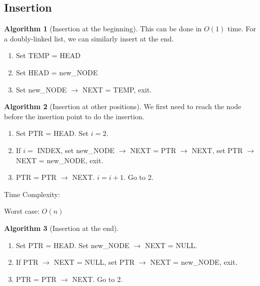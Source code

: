 \documentclass[10pt, a4paper]{extarticle}
\theoremstyle{definition}
\newtheorem{alg}{Algorithm}
\begin{document}
\subsection{Insertion}
\begin{alg}[Insertion at the beginning]
	This can be done in $O(1)$ time. For a doubly-linked list, we can similarly insert at the end.
	\begin{enumerate}
		\item Set TEMP = HEAD
		\item Set HEAD = new\_NODE
		\item Set new\_NODE $\to$ NEXT = TEMP, exit.
	\end{enumerate}

\end{alg}
\begin{alg}[Insertion at other positions]
	We first need to reach the node before the insertion point to do the insertion.
	\begin{enumerate}
		\item Set PTR = HEAD. Set $i=2$.
		\item If $i=$ INDEX, set new\_NODE $\to$ NEXT = PTR $\to$ NEXT, set PTR $\to$ NEXT = new\_NODE, exit.
		\item PTR = PTR $\to$ NEXT. $i=i+1$. Go to 2.
	\end{enumerate}
	Time Complexity:

	Worst case: $O(n)$
\end{alg}

\begin{alg}[Insertion at the end]
	\hfill
	\begin{enumerate}
		\item Set PTR = HEAD. Set new\_NODE $\to$ NEXT = NULL.
		\item If PTR $\to$ NEXT = NULL, set PTR $\to$ NEXT = new\_NODE, exit.
		\item PTR = PTR $\to$ NEXT. Go to 2.
	\end{enumerate}
\end{alg}
\end{document}

